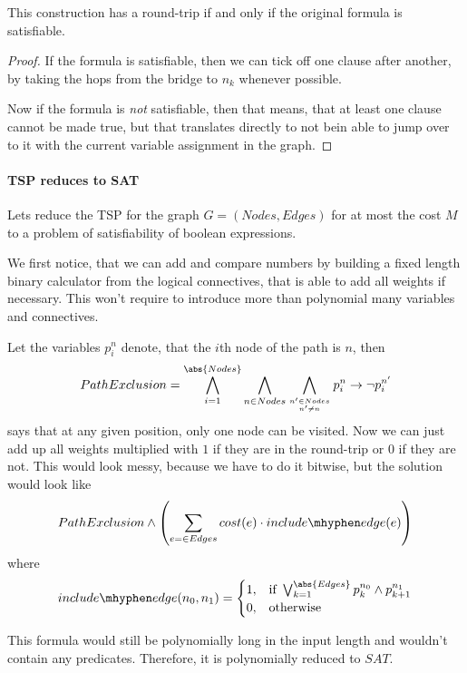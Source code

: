 \begin{theorem}
	This construction has a round-trip if and only if the original formula is satisfiable.
\end{theorem}
\begin{proof}
	If the formula is satisfiable, then we can tick off one clause after 
	another, by taking the hops from the bridge to $n_k$ whenever possible. 

	Now if the formula is \emph{not} satisfiable, then that means, that at 
	least one clause cannot be made true, but that translates directly to not 
	bein able to jump over to it with the current variable assignment in the graph.
\end{proof}
\paragraph{TSP reduces to SAT}
Lets reduce the TSP for the graph $G = (Nodes, Edges)$ for at most the cost
$M$ to a problem of satisfiability of boolean expressions.

We first notice, that we can add and compare numbers by building a fixed 
length binary calculator from the logical connectives, that is able to add 
all weights if necessary. This won't require to introduce more than 
polynomial many variables and connectives.

Let the variables $p_i^n$ denote, that the $i$th node of the path is $n$, 
then 
\[ PathExclusion = \bigwedge_{i=1}^{\abs{Nodes}}\bigwedge_{n\in Nodes} \bigwedge_{n'\in Nodes\atop n'\neq n} p_i^n \rightarrow \lnot p_i^{n'}\]
says that at any given position, only one node can be visited. Now we can 
just add up all weights multiplied with $1$ if they are in the round-trip or 
$0$ if they are not. This would look messy, because we have to do it bitwise, 
but the solution would look like
\[
	PathExclusion \wedge \left( \sum_{e=\in Edges} cost(e)\cdot 
	include\mhyphen edge(e) \right) \]
where 
\[ include\mhyphen edge(n_0, n_1)= \begin{cases}
		1, &\text{if }\bigvee_{k=1}^{\abs{Edges}} p_k^{n_0} \wedge p_{k+1}^{n_1}\\
		0, &\text{otherwise }
	\end{cases}\]

This formula would still be polynomially long in the input length and 
wouldn't contain any predicates. Therefore, it is polynomially reduced 
to $SAT$.
\DONE
